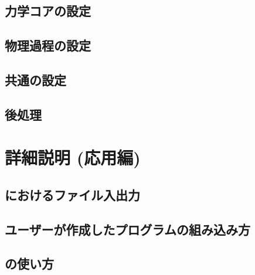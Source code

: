 \documentclass[a4paper]{jreport}
\begin{document}
 \chapter{力学コアの設定}


 \chapter{物理過程の設定} \label{sec:basic_usel_physics}

 \chapter{共通の設定}


 \chapter{後処理} \label{sec:basic_usel_post}

 \part{詳細説明 (応用編)} \label{part:advance}
 \chapter{\scalelib におけるファイル入出力}

 \chapter{ユーザーが作成したプログラムの組み込み方}
 \chapter{\scalelib の使い方}
\end{document}
